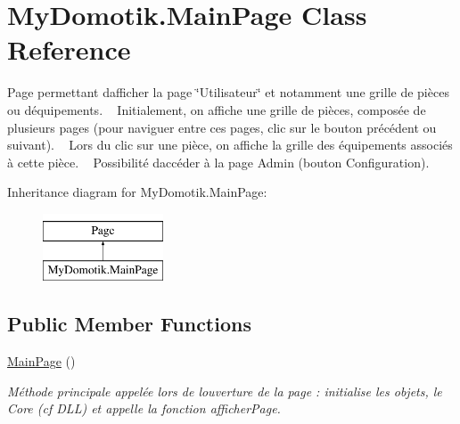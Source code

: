 \hypertarget{class_my_domotik_1_1_main_page}{}\section{My\+Domotik.\+Main\+Page Class Reference}
\label{class_my_domotik_1_1_main_page}


Page permettant d\textquotesingle{}afficher la page \char`\"{}\+Utilisateur\char`\"{} et notamment une grille de pièces ou d\textquotesingle{}équipements. ~\newline
Initialement, on affiche une grille de pièces, composée de plusieurs pages (pour naviguer entre ces pages, clic sur le bouton précédent ou suivant). ~\newline
Lors du clic sur une pièce, on affiche la grille des équipements associés à cette pièce. ~\newline
Possibilité d\textquotesingle{}accéder à la page Admin (bouton Configuration).  


Inheritance diagram for My\+Domotik.\+Main\+Page\+:\begin{figure}[H]
\begin{center}
\leavevmode
\includegraphics[height=2.000000cm]{class_my_domotik_1_1_main_page}
\end{center}
\end{figure}
\subsection*{Public Member Functions}
\begin{DoxyCompactItemize}
\item 
\hyperlink{class_my_domotik_1_1_main_page_a947aea957df3eb3208f574d7f8da3625}{Main\+Page} ()
\begin{DoxyCompactList}\small\item\em Méthode principale appelée lors de l\textquotesingle{}ouverture de la page \+: initialise les objets, le Core (cf D\+LL) et appelle la fonction afficher\+Page. \end{DoxyCompactList}\end{DoxyCompactItemize}
